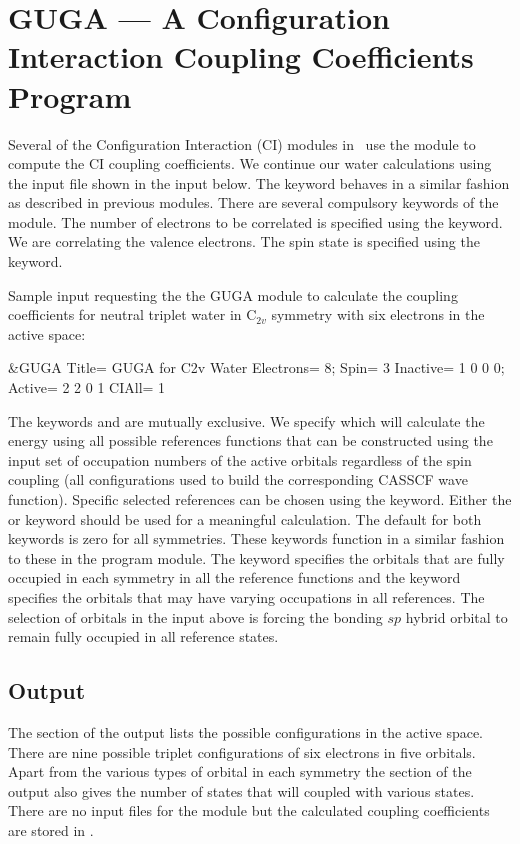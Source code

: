 \section[GUGA --- CI Coupling Coefficients Program]
        {GUGA --- A Configuration Interaction Coupling Coefficients Program}
\label{TUT:sec:guga}
Several of the Configuration Interaction (CI) modules in \molcas\ use
the  module to compute the CI coupling coefficients. 
We continue our water calculations using the input file shown in
the input below. The  keyword behaves
in a similar fashion as described in previous modules.  
There are several compulsory keywords of the  module. The
number of electrons to be correlated is specified using the 
 keyword.  We are correlating the valence electrons.
The spin state is specified using the  keyword.  

Sample input requesting the the GUGA module to calculate the coupling 
coefficients for neutral triplet water in C$_{2v}$ symmetry with six electrons 
in the active space:
\begin{inputlisting}
 &GUGA
Title= GUGA for C2v Water
Electrons= 8; Spin= 3
Inactive= 1 0 0 0; Active= 2 2 0 1
CIAll= 1
\end{inputlisting}

The keywords  and  are mutually
exclusive.  We specify  which will calculate the
energy using all possible references functions that can be constructed 
using the input set of occupation numbers of the active orbitals regardless of 
the spin coupling (all configurations used to build the corresponding CASSCF
wave function).  Specific selected references  can be chosen using the 
 keyword. Either the  or  
keyword should be used for a meaningful calculation.  The default for both 
keywords is zero for all symmetries.  These keywords function in a similar 
fashion to these in the  program module.  The 
keyword specifies the orbitals that are fully occupied in each symmetry
in all the reference functions and the  keyword
specifies the orbitals that may have varying occupations in all references.  
The selection of  orbitals in the input above 
is forcing the bonding $sp$ hybrid orbital to remain fully occupied in all 
reference states.

\subsection{ Output}

The  section of the output lists the possible configurations
in the active space. There are nine possible triplet configurations of
six electrons in five orbitals. Apart from the various types of orbital in each
symmetry the  section of the output also gives the number of 
states that will coupled with various states. There are no input files for the 
 module but the calculated coupling coefficients are stored in 
.

